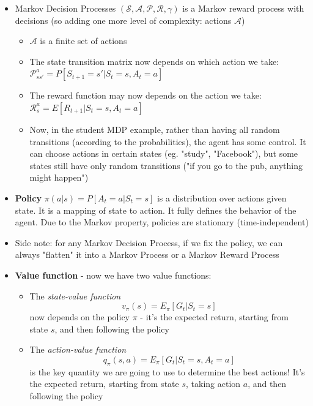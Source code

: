 \documentclass{article}
\begin{document}
\begin{itemize}
    \item Markov Decision Processes $(\mathcal{S}, \mathcal{A}, \mathcal{P}, \mathcal{R}, \gamma)$ is a Markov reward process with decisions (so adding one more level of complexity: actions $\mathcal{A}$)
    \begin{itemize}
        \item $\mathcal{A}$ is a finite set of actions
        \item The state transition matrix now depends on which action we take: $\mathcal{P}_{ss'}^a=P[S_{t+1}=s'|S_t=s, A_t=a]$
        \item The reward function may now depends on the action we take: $\mathcal{R}_s^a=E[R_{t+1}|S_t=s, A_t=a]$
        \item Now, in the student MDP example, rather than having all random transitions (according to the probabilities), the agent has some control. It can choose actions in certain states (eg. "study", "Facebook"), but some states still have only random transitions ("if you go to the pub, anything might happen")
    \end{itemize}
    \item \textbf{Policy} $\pi(a|s)=P[A_t=a|S_t=s]$ is a distribution over actions given state. It is a mapping of state to action. It fully defines the behavior of the agent. Due to the Markov property, policies are stationary (time-independent)
    \item Side note: for any Markov Decision Process, if we fix the policy, we can always "flatten" it into a Markov Process or a Markov Reward Process
    \item \textbf{Value function} - now we have two value functions:
    \begin{itemize}
        \item The \textit{state-value function}
        \begin{equation}
            v_\pi(s)=E_\pi[G_t|S_t=s]
        \end{equation} 
        now depends on the policy $\pi$ - it's the expected return, starting from state $s$, and then following the policy
        \item The \textit{action-value function}
        \begin{equation}
            q_\pi(s, a)=E_\pi[G_t|S_t=s, A_t=a]
        \end{equation}
        is the key quantity we are going to use to determine the best actions! It's the expected return, starting from state $s$, taking action $a$, and then following the policy

\end{itemize}
\end{itemize}
\end{document}
